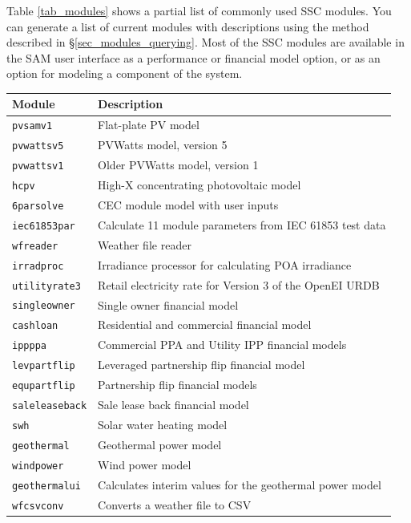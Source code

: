 \documentclass{scrartcl} %
\newcommand{\+}{\discretionary{\mbox{\scriptsize$\hookleftarrow$}}{}{}}
\begin{document}
Table \ref{tab_modules} shows a partial list of commonly used SSC modules. You can generate a list of current modules with descriptions using the method described in \S\ref{sec_modules_querying}. Most of the SSC modules are available in the SAM user interface as a performance or financial model option, or as an option for modeling a component of the system.

\begin{table}
\begin{center}
\begin{tabular}{ll}
Module & Description\\ \hline
\texttt{pvsamv1} & Flat-plate PV model\\
\texttt{pvwattsv5} & PVWatts model, version 5\\
\texttt{pvwattsv1} & Older PVWatts model, version 1\\
\texttt{hcpv} & High-X concentrating photovoltaic model\\
\texttt{6parsolve} & CEC module model with user inputs\\
\texttt{iec61853par} & Calculate 11 module parameters from IEC 61853 test data\\
\texttt{wfreader} & Weather file reader\\
\texttt{irradproc} & Irradiance processor for calculating POA irradiance\\
\texttt{utilityrate3} & Retail electricity rate for Version 3 of the OpenEI URDB\\
\texttt{singleowner} & Single owner financial model\\
\texttt{cashloan} & Residential and commercial financial model\\
\texttt{ippppa} & Commercial PPA and Utility IPP financial models\\
\texttt{levpartflip} & Leveraged partnership flip financial model\\
\texttt{equpartflip} & Partnership flip financial models\\
\texttt{saleleaseback} & Sale lease back financial model\\
\texttt{swh} & Solar water heating model\\
\texttt{geothermal} & Geothermal power model\\
\texttt{windpower} & Wind power model\\
\texttt{geothermalui} & Calculates interim values for the geothermal power model\\
\texttt{wfcsvconv} & Converts a weather file to CSV\\

\end{tabular}
\end{center}
\end{table}
\end{document}
